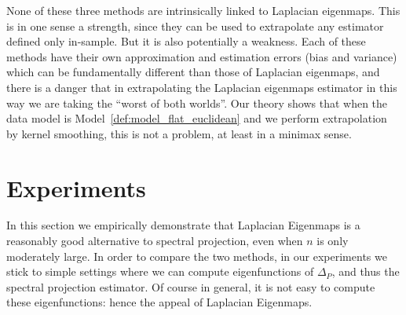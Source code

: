 \documentclass{article}
\newcommand{\Reals}{\mathbb{R}}
\newcommand{\1}{\mathbf{1}}
\newcommand{\mc}[1]{\mathcal{#1}}
\theoremstyle{alden}
\theoremstyle{aldenthm}
\theoremstyle{definition}
\theoremstyle{remark}
\begin{document}
\begin{itemize}
	None of these three methods are intrinsically linked to Laplacian eigenmaps. This is in one sense a strength, since they can be used to extrapolate any estimator defined only in-sample. But it is also potentially a weakness. Each of these methods have their own approximation and estimation errors (bias and variance) which can be fundamentally different than those of Laplacian eigenmaps, and there is a danger that in extrapolating the Laplacian eigenmaps estimator in this way we are taking the ``worst of both worlds''. Our theory shows that when the data model is Model~\ref{def:model_flat_euclidean} and we perform extrapolation by kernel smoothing, this is not a problem, at least in a minimax sense. 
	
\end{itemize}

\section{Experiments}
\label{sec:experiments}

In this section we empirically demonstrate that Laplacian Eigenmaps is a reasonably good alternative to spectral projection, even when $n$ is only moderately large. In order to compare the two methods, in our experiments we stick to simple settings where we can compute eigenfunctions of $\Delta_P$, and thus the spectral projection estimator. Of course in general, it is not easy to compute these eigenfunctions: hence the appeal of Laplacian Eigenmaps.
\end{document}
